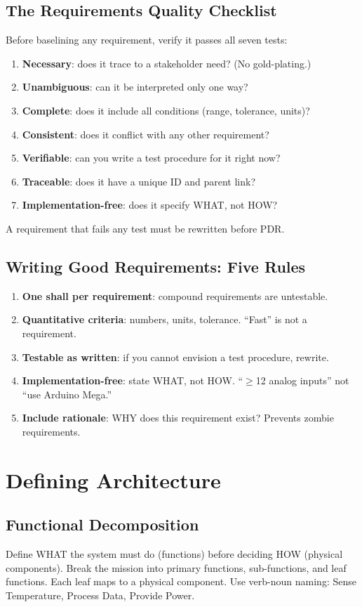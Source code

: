 \subsection{The Requirements Quality Checklist}
Before baselining any requirement, verify it passes all seven tests:
\begin{enumerate}[nosep,leftmargin=1.5em]
\item \textbf{Necessary}: does it trace to a stakeholder need? (No gold-plating.)
\item \textbf{Unambiguous}: can it be interpreted only one way?
\item \textbf{Complete}: does it include all conditions (range, tolerance, units)?
\item \textbf{Consistent}: does it conflict with any other requirement?
\item \textbf{Verifiable}: can you write a test procedure for it right now?
\item \textbf{Traceable}: does it have a unique ID and parent link?
\item \textbf{Implementation-free}: does it specify WHAT, not HOW?
\end{enumerate}
A requirement that fails any test must be rewritten before PDR.

\subsection{Writing Good Requirements: Five Rules}
\begin{enumerate}[leftmargin=1.5em]
\item \textbf{One shall per requirement}: compound requirements are untestable.
\item \textbf{Quantitative criteria}: numbers, units, tolerance. ``Fast'' is not a requirement.
\item \textbf{Testable as written}: if you cannot envision a test procedure, rewrite.
\item \textbf{Implementation-free}: state WHAT, not HOW. ``$\geq$12 analog inputs'' not ``use Arduino Mega.''
\item \textbf{Include rationale}: WHY does this requirement exist? Prevents zombie requirements.
\end{enumerate}

\section{Defining Architecture}
\subsection{Functional Decomposition}
Define WHAT the system must do (functions) before deciding HOW (physical components). Break the mission into primary functions, sub-functions, and leaf functions. Each leaf maps to a physical component. Use verb-noun naming: Sense Temperature, Process Data, Provide Power.

